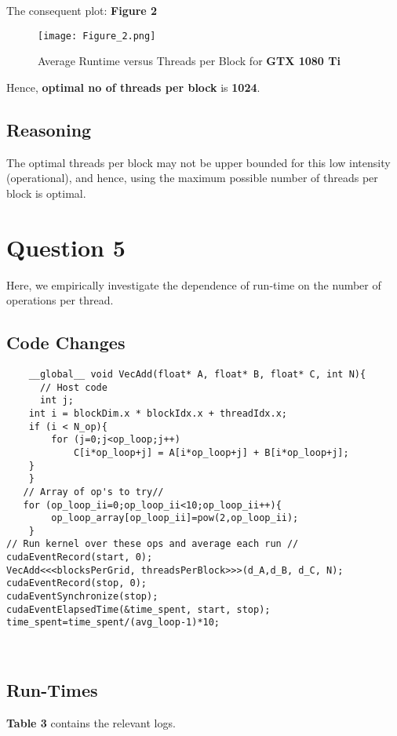 The consequent plot: \textbf{Figure 2}

\begin{figure}[ht]
\centering
\texttt{[image: Figure\_2.png]}
\caption{Average Runtime versus Threads per Block for \textbf{GTX 1080 Ti}}
\end{figure}

Hence, \textbf{optimal no of threads per block} is \textbf{1024}.\\

\subsection{Reasoning}

The optimal threads per block may not be upper bounded for this low intensity (operational), and hence, using the maximum possible number of threads per block is optimal.
\section {Question 5}

Here, we empirically investigate the dependence of run-time on the number of operations per thread.

\subsection{Code Changes} 
\begin{lstlisting}
	__global__ void VecAdd(float* A, float* B, float* C, int N){
      // Host code
      int j;
    int i = blockDim.x * blockIdx.x + threadIdx.x;
    if (i < N_op){
        for (j=0;j<op_loop;j++)
            C[i*op_loop+j] = A[i*op_loop+j] + B[i*op_loop+j];
    }
    }
   // Array of op's to try//
   for (op_loop_ii=0;op_loop_ii<10;op_loop_ii++){
        op_loop_array[op_loop_ii]=pow(2,op_loop_ii);
    }
// Run kernel over these ops and average each run //
cudaEventRecord(start, 0);
VecAdd<<<blocksPerGrid, threadsPerBlock>>>(d_A,d_B, d_C, N);
cudaEventRecord(stop, 0);
cudaEventSynchronize(stop);
cudaEventElapsedTime(&time_spent, start, stop);
time_spent=time_spent/(avg_loop-1)*10;
\end{lstlisting} \\

\subsection{Run-Times}

\textbf{Table 3} contains the relevant logs.

